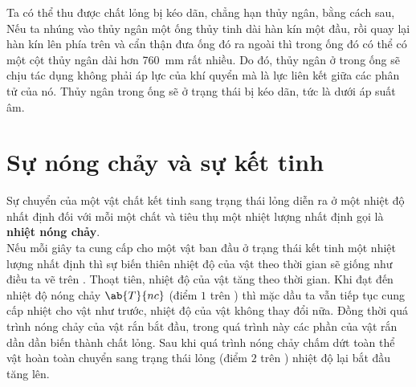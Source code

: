 Ta có thể thu được chất lỏng bị kéo dãn, chẳng hạn thủy ngân, bằng cách sau, Nếu ta nhúng vào thủy ngân một ống thủy tinh dài hàn kín một đầu, rồi quay lại hàn kín lên phía trên và cẩn thận đưa ống đó ra ngoài thì trong ống đó có thể có một cột thủy ngân dài hơn \SI{760}{\milli\metre} rất nhiều. Do đó, thủy ngân ở trong ống sẽ chịu tác dụng không phải áp lực của khí quyển mà là lực liên kết giữa các phân tử của nó. Thủy ngân trong ống sẽ ở trạng thái bị kéo dãn, tức là dưới áp suất âm.\\

\section{Sự nóng chảy và sự kết tinh}\label{sec:15_6}

Sự chuyển của một vật chất kết tinh sang trạng thái lỏng diễn ra ở một nhiệt độ nhất định đối với mỗi một chất và tiêu thụ một nhiệt lượng nhất định gọi là \textbf{nhiệt nóng chảy}.\\

Nếu mỗi giây ta cung cấp cho một vật ban đầu ở trạng thái kết tinh một nhiệt lượng nhất định thì sự biến thiên nhiệt độ của vật theo thời gian sẽ giống như điều ta vẽ trên . Thoạt tiên, nhiệt độ của vật tăng theo thời gian. Khi đạt đến nhiệt độ nóng chảy $\ab{T}{nc}$ (điểm $1$ trên ) thì mặc dầu ta vẫn tiếp tục cung cấp nhiệt cho vật như trước, nhiệt độ của vật không thay đổi nữa. Đồng thời quá trình nóng chảy của vật rắn bắt đầu, trong quá trình này các phần của vật rắn dần dần biến thành chất lỏng. Sau khi quá trình nóng chảy chấm dứt toàn thể vật hoàn toàn chuyển sang trạng thái lỏng (điểm $2$ trên ) nhiệt độ lại bắt đầu tăng lên.\\

